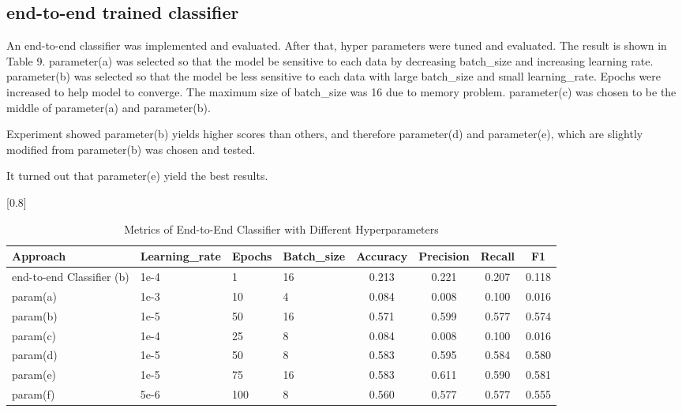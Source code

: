 \documentclass[a4paper,11pt]{article}
\begin{document}
\subsection{end-to-end trained classifier}
An end-to-end classifier was implemented and evaluated.
After that, hyper parameters were tuned and evaluated.
The result is shown  in Table 9.
parameter(a) was selected so that the model be sensitive to each data 
by decreasing batch\_size and increasing learning rate.
parameter(b) was selected so that the model be less sensitive to each data
with large batch\_size and small learning\_rate. Epochs were increased to help model to converge.
The maximum size of batch\_size was 16 due to memory problem.
parameter(c) was chosen to be the middle of parameter(a) and parameter(b).

Experiment showed parameter(b) yields higher scores than others, and therefore
parameter(d) and parameter(e), which are slightly modified from parameter(b) was chosen and tested.



It turned out that parameter(e) yield the best results.


\begin{table}[htbp]
    \caption{Metrics of End-to-End Classifier with Different Hyperparameters}
    \small
    \scalebox{0.8}[0.8]{
    \begin{tabular}{l|lll|cccc}
         Approach & Learning\_rate & Epochs & Batch\_size & Accuracy & Precision & Recall & F1 \\ \hline 
         end-to-end Classifier (b) & 1e-4& 1 & 16 & 0.213 & 0.221 &0.207 & 0.118 \\
         param(a)                  & 1e-3& 10& 4  & 0.084 & 0.008 & 0.100 & 0.016 \\
         param(b)                  & 1e-5& 50& 16 & 0.571 & 0.599 & 0.577 & 0.574 \\
         param(c)                  & 1e-4& 25& 8  & 0.084 & 0.008 & 0.100 & 0.016 \\ \hline
         param(d)                  & 1e-5& 50& 8  & 0.583 & 0.595 & 0.584 & 0.580 \\
         \rowcolor[rgb]{0.9,0.9,0}param(e)                  & 1e-5& 75& 16 & 0.583 & 0.611 & 0.590 & 0.581 \\
         param(f)                  & 5e-6& 100& 8 & 0.560 & 0.577 & 0.577 & 0.555 \\


    \end{tabular}

    }
\end{table}
\end{document}
